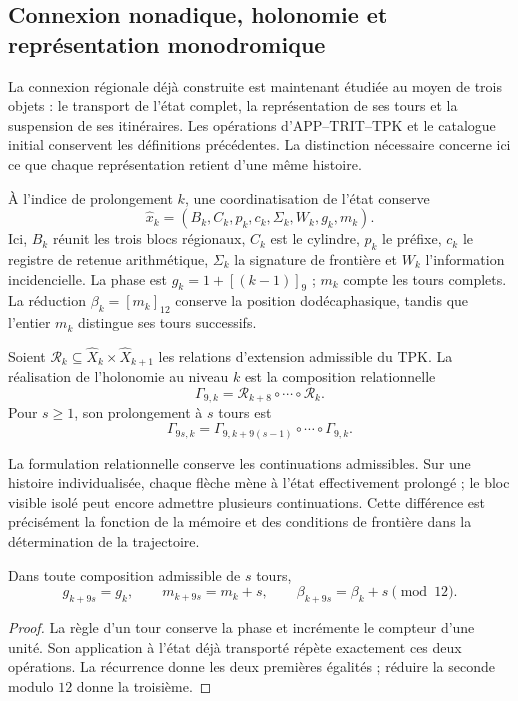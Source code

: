 \subsection{Connexion nonadique, holonomie et représentation monodromique}
\label{mono-ampl:conexion}

La connexion régionale déjà construite est maintenant étudiée au moyen de trois objets : le transport de l'état complet, la représentation de ses tours et la suspension de ses itinéraires. Les opérations d'APP--TRIT--TPK et le catalogue initial conservent les définitions précédentes. La distinction nécessaire concerne ici ce que chaque représentation retient d'une même histoire.

À l'indice de prolongement \(k\), une coordinatisation de l'état conserve
\[
 \widehat x_k=(B_k,C_k,p_k,c_k,\Sigma_k,W_k,g_k,m_k).
\]
Ici, \(B_k\) réunit les trois blocs régionaux, \(C_k\) est le cylindre,
\(p_k\) le préfixe, \(c_k\) le registre de retenue arithmétique, \(\Sigma_k\) la signature
de frontière et \(W_k\) l'information incidencielle. La phase est
\(g_k=1+[(k-1)]_9\) ; \(m_k\) compte les tours complets. La réduction
\(\beta_k=[m_k]_{12}\) conserve la position dodécaphasique, tandis que
l'entier \(m_k\) distingue ses tours successifs.

\begin{definition}
\label{mono-ampl:def-vuelta}
Soient \(\mathcal R_k\subseteq\widehat X_k\times\widehat X_{k+1}\)
les relations d'extension admissible du TPK. La réalisation de
l'holonomie au niveau \(k\) est la composition relationnelle
\[
 \Gamma_{9,k}=\mathcal R_{k+8}\circ\cdots\circ\mathcal R_k.
\]
Pour \(s\geq1\), son prolongement à \(s\) tours est
\[
 \Gamma_{9s,k}=
 \Gamma_{9,k+9(s-1)}\circ\cdots\circ\Gamma_{9,k}.
\]
\end{definition}

La formulation relationnelle conserve les continuations admissibles. Sur
une histoire individualisée, chaque flèche mène à l'état effectivement
prolongé ; le bloc visible isolé peut encore admettre plusieurs
continuations. Cette différence est précisément la fonction de la mémoire et
des conditions de frontière dans la détermination de la trajectoire.

\begin{proposition}
\label{mono-ampl:vueltas}
Dans toute composition admissible de \(s\) tours,
\[
 g_{k+9s}=g_k,\qquad m_{k+9s}=m_k+s,\qquad
 \beta_{k+9s}=\beta_k+s\pmod{12}.
\]
\end{proposition}
\begin{proof}
La règle d'un tour conserve la phase et incrémente le compteur d'une
unité. Son application à l'état déjà transporté répète exactement ces
deux opérations. La récurrence donne les deux premières égalités ; réduire la
seconde modulo \(12\) donne la troisième.
\end{proof}

